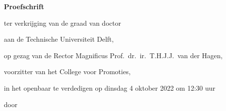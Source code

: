 \begin{titlepage}

\begin{center}

\vspace*{2\bigskipamount}

{\makeatletter
\titlestyle\bfseries\LARGE\@title
\makeatother}

{\makeatletter
\ifx\@subtitle\undefined\else
    \bigskip
    \titlefont\titleshape\Large\@subtitle
\fi
\makeatother}

\end{center}

\cleardoublepage
\thispagestyle{empty}

\begin{center}


\vspace*{2\bigskipamount}

{\makeatletter
\titlestyle\bfseries\LARGE\@title
\makeatother}

{\makeatletter
\ifx\@subtitle\undefined\else
    \bigskip
    \titlefont\titleshape\Large\@subtitle
\fi
\makeatother}

\vfill


{\Large\titlefont\bfseries Proefschrift}

\bigskip
\bigskip

ter verkrijging van de graad van doctor

aan de Technische Universiteit Delft,

op gezag van de Rector Magnificus Prof.~dr.~ir.~T.H.J.J.~van der Hagen,

voorzitter van het College voor Promoties,

in het openbaar te verdedigen op dinsdag 4 oktober 2022 om 12:30 uur

\bigskip
\bigskip

door

\bigskip
\bigskip


\end{center}
\end{titlepage}
